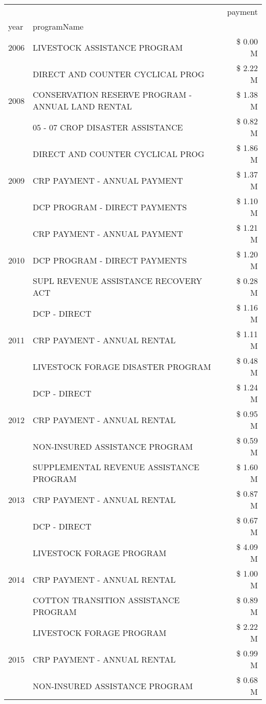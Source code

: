 \begin{tabular}{llr}
\toprule
 &  & payment \\
year & programName &  \\
\midrule
2006 & LIVESTOCK ASSISTANCE PROGRAM & \$ 0.00 M \\
\cline{1-3}
\multirow[t]{3}{*}{2008} & DIRECT AND COUNTER CYCLICAL PROG & \$ 2.22 M \\
 & CONSERVATION RESERVE PROGRAM - ANNUAL LAND RENTAL & \$ 1.38 M \\
 & 05 - 07 CROP DISASTER ASSISTANCE & \$ 0.82 M \\
\cline{1-3}
\multirow[t]{3}{*}{2009} & DIRECT AND COUNTER CYCLICAL PROG & \$ 1.86 M \\
 & CRP PAYMENT - ANNUAL PAYMENT & \$ 1.37 M \\
 & DCP PROGRAM - DIRECT PAYMENTS & \$ 1.10 M \\
\cline{1-3}
\multirow[t]{3}{*}{2010} & CRP PAYMENT - ANNUAL PAYMENT & \$ 1.21 M \\
 & DCP PROGRAM - DIRECT PAYMENTS & \$ 1.20 M \\
 & SUPL REVENUE ASSISTANCE RECOVERY ACT & \$ 0.28 M \\
\cline{1-3}
\multirow[t]{3}{*}{2011} & DCP - DIRECT & \$ 1.16 M \\
 & CRP PAYMENT - ANNUAL RENTAL & \$ 1.11 M \\
 & LIVESTOCK FORAGE DISASTER PROGRAM & \$ 0.48 M \\
\cline{1-3}
\multirow[t]{3}{*}{2012} & DCP - DIRECT & \$ 1.24 M \\
 & CRP PAYMENT - ANNUAL RENTAL & \$ 0.95 M \\
 & NON-INSURED ASSISTANCE PROGRAM & \$ 0.59 M \\
\cline{1-3}
\multirow[t]{3}{*}{2013} & SUPPLEMENTAL REVENUE ASSISTANCE PROGRAM & \$ 1.60 M \\
 & CRP PAYMENT - ANNUAL RENTAL & \$ 0.87 M \\
 & DCP - DIRECT & \$ 0.67 M \\
\cline{1-3}
\multirow[t]{3}{*}{2014} & LIVESTOCK FORAGE PROGRAM & \$ 4.09 M \\
 & CRP PAYMENT - ANNUAL RENTAL & \$ 1.00 M \\
 & COTTON TRANSITION ASSISTANCE PROGRAM & \$ 0.89 M \\
\cline{1-3}
\multirow[t]{3}{*}{2015} & LIVESTOCK FORAGE PROGRAM & \$ 2.22 M \\
 & CRP PAYMENT - ANNUAL RENTAL & \$ 0.99 M \\
 & NON-INSURED ASSISTANCE PROGRAM & \$ 0.68 M \\

\end{tabular}
